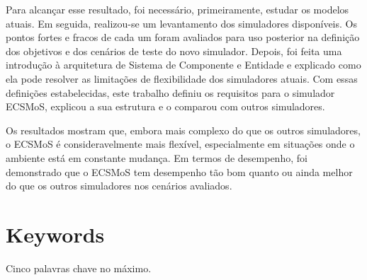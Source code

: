 \documentclass[twoside, 11pt]{article}
\begin{document}
Para alcançar esse resultado, foi necessário, primeiramente, estudar os modelos atuais. Em seguida, realizou-se um levantamento dos simuladores disponíveis. Os pontos fortes e fracos de cada um foram avaliados para uso posterior na definição dos objetivos e dos cenários de teste do novo simulador. Depois, foi feita uma introdução à arquitetura de Sistema de Componente e Entidade e explicado como ela pode resolver as limitações de flexibilidade dos simuladores atuais. Com essas definições estabelecidas, este trabalho definiu os requisitos para o simulador ECSMoS, explicou a sua estrutura e o comparou com outros simuladores.

Os resultados mostram que, embora mais complexo do que os outros simuladores, o ECSMoS é consideravelmente mais flexível, especialmente em situações onde o ambiente está em constante mudança. Em termos de desempenho, foi demonstrado que o ECSMoS tem desempenho tão bom quanto ou ainda melhor do que os outros simuladores nos cenários avaliados.

\section*{Keywords}

Cinco palavras chave no máximo.

\clearpage            %
\null                %
\newpage             %

\printglossary[type=\acronymtype,nogroupskip=true,nonumberlist, title=List of Abbreviations]

\clearpage            %
\null                %
\newpage             %

\renewcommand{\contentsname}{General Index}
\tableofcontents

\clearpage            %
\null                %
\newpage             %

\renewcommand{\listfigurename}{Figure Index}
\listoffigures

\clearpage            %
\null                %
\newpage             %

\renewcommand{\listtablename}{Table Index}
\listoftables
\end{document}
